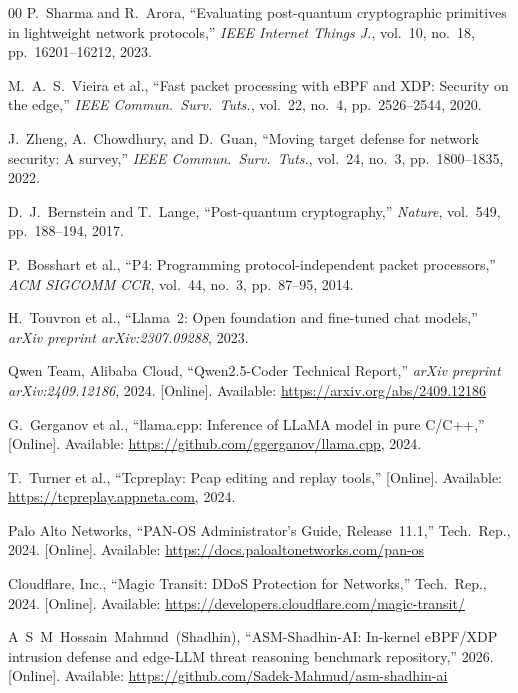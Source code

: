\documentclass{ieeeaccess}
\renewcommand{\_}{\textunderscore\allowbreak}
\begin{document}
\begin{thebibliography}{00}
P.~Sharma and R.~Arora, ``Evaluating post-quantum cryptographic primitives in
lightweight network protocols,'' \emph{IEEE Internet Things J.}, vol.~10, no.~18,
pp.~16201--16212, 2023.

M.~A.~S.~Vieira et al., ``Fast packet processing with eBPF and XDP: Security on
the edge,'' \emph{IEEE Commun.\ Surv.\ Tuts.}, vol.~22, no.~4, pp.~2526--2544,
2020.

J.~Zheng, A.~Chowdhury, and D.~Guan, ``Moving target defense for network security:
A survey,'' \emph{IEEE Commun.\ Surv.\ Tuts.}, vol.~24, no.~3, pp.~1800--1835,
2022.

D.~J.~Bernstein and T.~Lange, ``Post-quantum cryptography,'' \emph{Nature},
vol.~549, pp.~188--194, 2017.

P.~Bosshart et al., ``P4: Programming protocol-independent packet processors,''
\emph{ACM SIGCOMM CCR}, vol.~44, no.~3, pp.~87--95, 2014.

H.~Touvron et al., ``Llama~2: Open foundation and fine-tuned chat models,''
\emph{arXiv preprint arXiv:2307.09288}, 2023.

Qwen Team, Alibaba Cloud, ``Qwen2.5-Coder Technical Report,''
\emph{arXiv preprint arXiv:2409.12186}, 2024. [Online]. Available:
\url{https://arxiv.org/abs/2409.12186}

G.~Gerganov et al., ``llama.cpp: Inference of LLaMA model in pure C/C++,''
[Online]. Available: \url{https://github.com/ggerganov/llama.cpp}, 2024.

T.~Turner et al., ``Tcpreplay: Pcap editing and replay tools,''
[Online]. Available: \url{https://tcpreplay.appneta.com}, 2024.

Palo Alto Networks, ``PAN-OS Administrator's Guide, Release~11.1,''
Tech.\ Rep., 2024. [Online]. Available:
\url{https://docs.paloaltonetworks.com/pan-os}

Cloudflare, Inc., ``Magic Transit: DDoS Protection for Networks,''
Tech.\ Rep., 2024. [Online]. Available:
\url{https://developers.cloudflare.com/magic-transit/}

A~S~M~Hossain~Mahmud~(Shadhin), ``ASM-Shadhin-AI: In-kernel eBPF/XDP intrusion defense and edge-LLM threat reasoning benchmark repository,'' 2026. [Online]. Available: \url{https://github.com/Sadek-Mahmud/asm-shadhin-ai}

\end{thebibliography}
\end{document}

